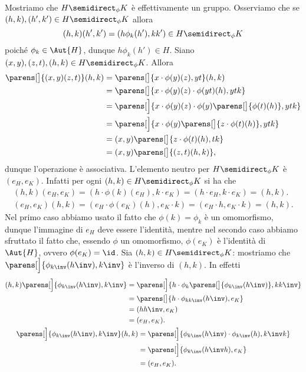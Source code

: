 Mostriamo che $H \semidirect_{\phi} K$ è effettivamente un gruppo.
 Osserviamo che se $(h, k), (h', k') \in H \semidirect_{\phi} K$ allora \[
    (h, k)(h', k') = (h\phi_k(h'), kk') \in H \semidirect_{\phi} K
\] poiché $\phi_k \in \Aut{H}$, dunque $h\phi_k(h') \in H$.
 Siano $(x, y), (z, t), (h, k) \in H \semidirect_{\phi} K$. Allora \begin{align*}
    \parens[\big]{(x, y)(z, t)}(h, k) 
    &= \parens[\big]{x \cdot \phi(y)(z), yt}(h, k)\\
    &= \parens[\big]{x \cdot \phi(y)(z) \cdot \phi(yt)(h), ytk} \\
    &= \parens[\Big]{x \cdot \phi(y)(z) \cdot \phi(y)\parens[\big]{\phi(t)(h)}, ytk} \\
    &= \parens[\Big]{x \cdot \phi(y)\parens[\big]{z \cdot \phi(t)(h)}, ytk} \\
    &= (x, y)\parens[\big]{z \cdot \phi(t)(h), tk} \\
    &= (x, y)\parens[\big]{(z, t)(h, k)},
\end{align*} dunque l'operazione è associativa.
 L'elemento neutro per $H \semidirect_{\phi} K$ è $(e_H, e_K)$. Infatti per ogni $(h, k) \in H \semidirect_{\phi} K$ si ha che \begin{gather*}
    (h, k)(e_H, e_K) = (h \cdot \phi(k)(e_H), k \cdot e_K) = (h \cdot e_H, k \cdot e_K) = (h, k).\\
    (e_H, e_K)(h, k) = (e_H \cdot \phi(e_K)(h), e_K \cdot k) = (e_H \cdot h, e_K \cdot k) = (h, k).
\end{gather*} Nel primo caso abbiamo usato il fatto che $\phi(k) = \phi_k$ è un omomorfismo, dunque l'immagine di $e_H$ deve essere l'identità, mentre nel secondo caso abbiamo sfruttato il fatto che, essendo $\phi$ un omomorfismo, $\phi(e_K)$ è l'identità di $\Aut{H}$, ovvero $\phi(e_K) = \id$.
 Sia $(h, k) \in H \semidirect_{\phi} K$: mostriamo che $\parens[\Big]{\phi_{k\inv}(h\inv), k\inv}$ è l'inverso di $(h, k)$. In effetti \begin{gather*}
    (h, k)\parens[\Big]{\phi_{k\inv}(h\inv), k\inv} 
    \begin{aligned}[t]
        &= \parens[\Big]{h \cdot \phi_{k}\parens[\big]{\phi_{k\inv}(h\inv)}, kk\inv} \\
        &= \parens[\big]{h \cdot \phi_{kk\inv}(h\inv), e_K} \\
        &= (hh\inv, e_K) \\
        &= (e_H, e_K).
    \end{aligned}\\
    \parens[\Big]{\phi_{k\inv}(h\inv), k\inv}(h, k) 
    \begin{aligned}[t]
        &= \parens[\Big]{\phi_{k\inv}(h\inv) \cdot \phi_{k\inv}(h), k\inv k} \\
        &= \parens[\Big]{\phi_{k\inv}(h\inv h), e_K} \\
        &= (e_H, e_K).
    \end{aligned}
\end{gather*}

